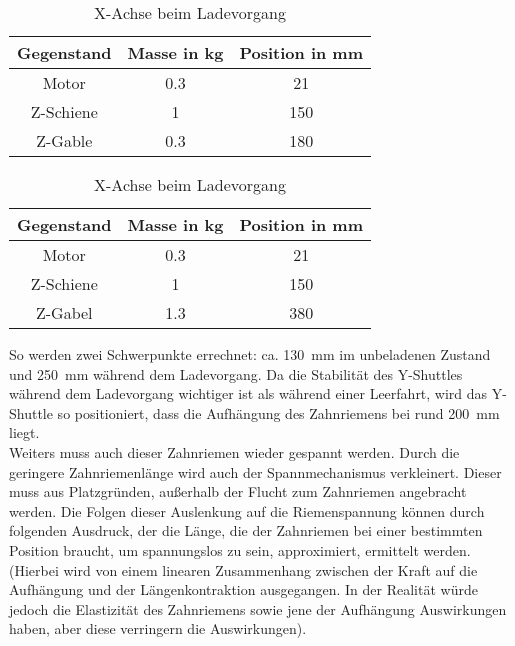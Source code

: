 \begin{table}[H]
    \centering
    \centering
        \begin{tabular}{c c c}
            Gegenstand & Masse in kg & Position in mm\\
            \hline
            Motor & 0.3 & 21 \\
            Z-Schiene & 1 & 150 \\
            Z-Gable & 0.3 & 180 
        \end{tabular}
    \caption{X-Achse unbeladen und eingefahren}
        \vspace{5mm}
        \centering
        \begin{tabular}{c c c}
            Gegenstand & Masse in kg & Position in mm\\ 
            \hline
            Motor & 0.3 & 21 \\
            Z-Schiene & 1 & 150 \\
            Z-Gabel & 1.3 & 380
        \end{tabular}
        \caption{X-Achse beim Ladevorgang}
\end{table}
So werden zwei Schwerpunkte errechnet: ca. \SI{130}{\mm} im unbeladenen Zustand und \SI{250}{\mm} während dem Ladevorgang. Da die Stabilität des Y-Shuttles während dem Ladevorgang wichtiger ist als während einer Leerfahrt, wird das Y-Shuttle so positioniert, dass die Aufhängung des Zahnriemens bei rund \SI{200}{\mm} liegt.\\
Weiters muss auch dieser Zahnriemen wieder gespannt werden. Durch die geringere Zahnriemenlänge wird auch der Spannmechanismus verkleinert.
Dieser muss aus Platzgründen, außerhalb der Flucht zum Zahnriemen angebracht werden. Die Folgen dieser Auslenkung auf die Riemenspannung können durch folgenden Ausdruck, der die Länge, die der Zahnriemen bei einer bestimmten Position braucht, um spannungslos zu sein, approximiert, ermittelt werden. (Hierbei wird von einem linearen Zusammenhang zwischen der Kraft auf die Aufhängung und der Längenkontraktion ausgegangen. In der Realität würde jedoch die Elastizität des Zahnriemens sowie jene der Aufhängung Auswirkungen haben, aber diese verringern die Auswirkungen).
\\

